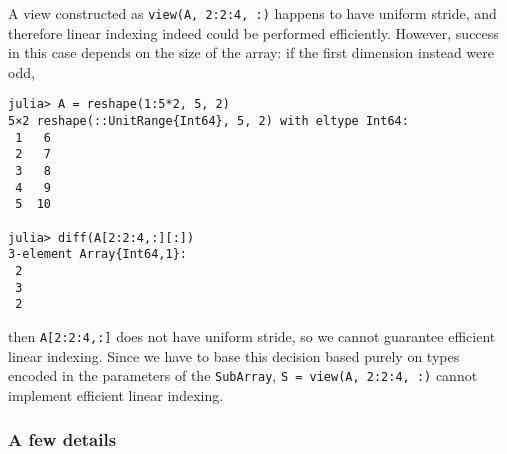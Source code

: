 A view constructed as \texttt{view(A, 2:2:4, :)} happens to have uniform stride, and therefore linear indexing indeed could be performed efficiently.  However, success in this case depends on the size of the array: if the first dimension instead were odd,




\begin{verbatim}
julia> A = reshape(1:5*2, 5, 2)
5×2 reshape(::UnitRange{Int64}, 5, 2) with eltype Int64:
 1   6
 2   7
 3   8
 4   9
 5  10

julia> diff(A[2:2:4,:][:])
3-element Array{Int64,1}:
 2
 3
 2
\end{verbatim}



then \texttt{A[2:2:4,:]} does not have uniform stride, so we cannot guarantee efficient linear indexing.  Since we have to base this decision based purely on types encoded in the parameters of the \texttt{SubArray}, \texttt{S = view(A, 2:2:4, :)} cannot implement efficient linear indexing.



\hypertarget{6217885754113158897}{}


\subsubsection{A few details}



